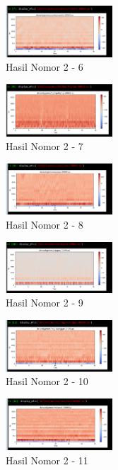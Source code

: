 \begin{enumerate}
\begin{figure}[H]
	\end{figure}
	\begin{figure}[H]
		\includegraphics[width=4cm]{figures/1174054/6/16.png}
		\centering
		\caption{Hasil Nomor 2 - 6}
	\end{figure}
	\begin{figure}[H]
		\includegraphics[width=4cm]{figures/1174054/6/17.png}
		\centering
		\caption{Hasil Nomor 2 - 7}
	\end{figure}
	\begin{figure}[H]
		\includegraphics[width=4cm]{figures/1174054/6/18.png}
		\centering
		\caption{Hasil Nomor 2 - 8}
	\end{figure}
	\begin{figure}[H]
		\includegraphics[width=4cm]{figures/1174054/6/19.png}
		\centering
		\caption{Hasil Nomor 2 - 9}
	\end{figure}
	\begin{figure}[H]
		\includegraphics[width=4cm]{figures/1174054/6/20.png}
		\centering
		\caption{Hasil Nomor 2 - 10}
	\end{figure}
	\begin{figure}[H]
		\includegraphics[width=4cm]{figures/1174054/6/21.png}
		\centering
		\caption{Hasil Nomor 2 - 11}
	\end{figure}
	

\end{enumerate}
